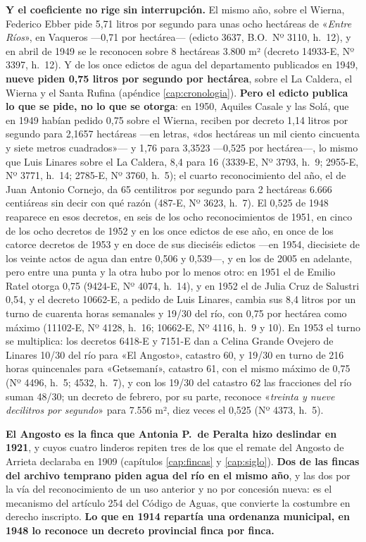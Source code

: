 \begin{cautela}
\textbf{Y el coeficiente no rige sin interrupción.} El mismo año, sobre el Wierna, Federico Ebber
pide 5,71 litros por segundo para unas ocho hectáreas de «\textit{Entre Ríos}», en Vaqueros ---0,71 por
hectárea--- (edicto 3637, B.O.\ Nº 3110, h.\ 12), y en abril de 1949 se le reconocen sobre 8 hectáreas
3.800 m² (decreto 14933-E, Nº 3397, h.\ 12). Y de los once edictos de agua del departamento publicados
en 1949, \textbf{nueve piden 0,75 litros por segundo por hectárea}, sobre el La Caldera, el Wierna y el
Santa Rufina (apéndice \ref{cap:cronologia}). \textbf{Pero el edicto publica lo que se pide, no lo que
se otorga}: en 1950, Aquiles Casale y las Solá, que en 1949 habían pedido 0,75 sobre el Wierna,
reciben por decreto 1,14 litros por segundo para 2,1657 hectáreas ---en letras, «dos hectáreas un mil ciento cincuenta y siete metros cuadrados»--- y 1,76 para 3,3523 ---0,525 por
hectárea---, lo mismo que Luis Linares sobre el La Caldera, 8,4 para 16 (3339-E, Nº 3793, h.\ 9;
2955-E, Nº 3771, h.\ 14; 2785-E, Nº 3760, h.\ 5); el cuarto reconocimiento del año, el de Juan
Antonio Cornejo, da 65 centilitros por segundo para 2 hectáreas 6.666 centiáreas sin decir con qué
razón (487-E, Nº 3623, h.\ 7). El 0,525 de 1948 reaparece en esos decretos, en seis de los ocho reconocimientos de 1951, en cinco de los ocho decretos de 1952 y en los once edictos de ese año, en once de los catorce decretos de 1953 y en doce de sus dieciséis edictos ---en 1954, diecisiete de los veinte actos de agua dan entre 0,506 y 0,539---, y en los de 2005 en
adelante, pero entre una punta y la otra hubo por lo menos otro: en 1951 el de Emilio Ratel otorga 0,75 (9424-E, Nº 4074, h.\ 14), y en 1952 el de Julia Cruz de Salustri 0,54, y el decreto 10662-E, a pedido de Luis Linares, cambia sus 8,4 litros por un turno de cuarenta horas semanales y 19/30 del río, con 0,75 por hectárea como máximo (11102-E, Nº 4128, h.\ 16; 10662-E, Nº 4116, h.\ 9 y 10). En 1953 el turno se multiplica: los decretos 6418-E y 7151-E dan a Celina Grande Ovejero de Linares 10/30 del río para «El Angosto», catastro 60, y 19/30 en turno de 216 horas quincenales para «Getsemaní», catastro 61, con el mismo máximo de 0,75 (Nº 4496, h.\ 5; 4532, h.\ 7), y con los 19/30 del catastro 62 las fracciones del río suman 48/30; un decreto de febrero, por su parte, reconoce «\textit{treinta y nueve decilitros por segundo}» para 7.556 m², diez veces el 0,525 (Nº 4373, h.\ 5).
\end{cautela}

\textbf{El Angosto es la finca que Antonia P.\ de Peralta hizo deslindar en 1921}, y cuyos
cuatro linderos repiten tres de los que el remate del Angosto de Arrieta declaraba en 1909
(capítulos \ref{cap:fincas} y \ref{cap:siglo}). \textbf{Dos de las fincas del archivo
temprano piden agua del río en el mismo año}, y las dos por la vía del reconocimiento de un
uso anterior y no por concesión nueva: es el mecanismo del artículo 254 del Código de Aguas,
que convierte la costumbre en derecho inscripto. \textbf{Lo que en 1914 repartía una
ordenanza municipal, en 1948 lo reconoce un decreto provincial finca por finca.}

